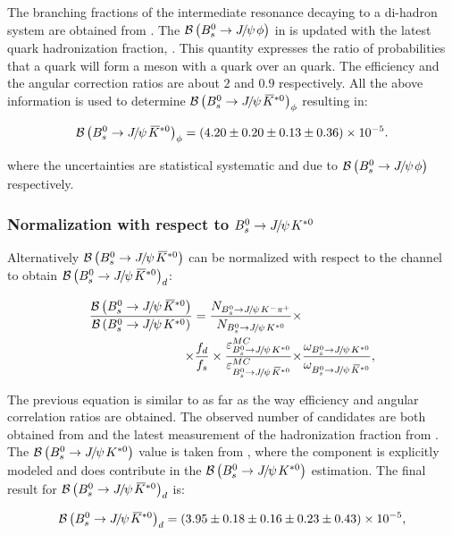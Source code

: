 \noindent The branching fractions of the intermediate resonance decaying to a di-hadron system are obtained from \cite{PDG}.
The $\BRof\BsJpsiPhi$ in \cite{SheldonKK} is updated with the latest \bquark quark hadronization
fraction, \fdfs \cite{LHCb-CONF-2013-011}. This quantity expresses the ratio of probabilities that a \bquark quark will form a meson with a
\dquark quark over an \squark quark. The efficiency and the angular correction ratios are about $2$ and $0.9$ respectively.
All the above information is used to determine $\BRof{\BsJpsiKst}_\phi$ resulting in:

\begin{equation}
  \centering
\BRof\BsJpsiKst_{\phi} = (4.20 \pm 0.20 \pm 0.13 \pm 0.36) \times 10^{-5}.
\label{Br_JpsiPhi}
\end{equation}

where the uncertainties are statistical systematic and due to $\BRof\BsJpsiPhi$ respectively.

\subsubsection{Normalization with respect to $\BdJpsiKst$}
Alternatively $\BRof\BsJpsiKst$ can be normalized with respect to the \BdJpsiKst channel to obtain $\BRof{\BsJpsiKst}_d$:

\begin{align}
  \centering
\frac{\BRof\BsJpsiKst}{\BRof\BdJpsiKst} = \frac{N_{\BsJpsiKpi}}{N_{\BdJpsiKst}} \times & \nonumber \\
                                   \times \fdfs
                                   \times \frac{\varepsilon_{\BdJpsiKst}^{MC}}{\varepsilon_{\BsJpsiKst}^{MC}}
                                   \times &\frac{\omega_{\BdJpsiKst}}{\omega_{\BsJpsiKst}},
\label{norm_jpsiKst}
\end{align}

\noindent The previous equation is similar to  as far as the way efficiency and angular correlation ratios are obtained.
The observed number of candidates are both obtained from  and the latest measurement of the hadronization
fraction from \cite{LHCb-CONF-2013-011}. The $\BRof\BdJpsiKst$ value is taken from \cite{Abe:2002haa}, where the \swave component 
is explicitly modeled and does contribute in the $\BRof\BdJpsiKst$ estimation. The final result for $\BRof{\BsJpsiKst}_d$ is:

\begin{equation}
  \centering
\BRof\BsJpsiKst_{d} = (3.95 \pm 0.18 \pm 0.16 \pm 0.23 \pm 0.43 )\times 10^{-5},
\label{Br_JpsiKst}
\end{equation}

